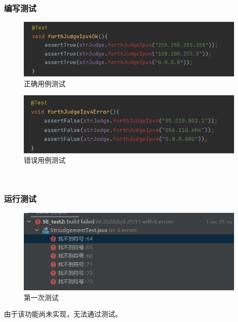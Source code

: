 \documentclass[a4paper]{article}
\begin{document}
\subsubsection*{编写测试}
\begin{figure}[h]
    \centering
    \includegraphics[scale=0.8]{4.1.png}
    \caption{正确用例测试}
    \label{fig:17}
\end{figure}
\begin{figure}[h]
    \centering
    \includegraphics[scale=0.8]{4.2.png}
    \caption{错误用例测试}
    \label{fig:18}
\end{figure}
~\\
\subsubsection*{运行测试}
\begin{figure}[h]
    \centering
    \includegraphics[scale=0.9]{4.3.png}
    \caption{第一次测试}
    \label{fig:19}
\end{figure}
由于该功能尚未实现，无法通过测试。
\end{document}
